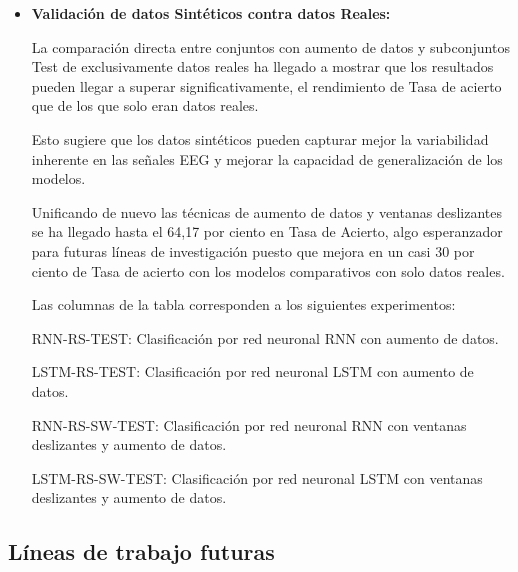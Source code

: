 \begin{itemize}
	
	\item
	\textbf{Validación de datos Sintéticos contra datos Reales:}


	La comparación directa entre conjuntos con aumento de datos y subconjuntos Test de exclusivamente datos reales ha llegado a mostrar que los resultados  pueden llegar a superar significativamente, el rendimiento de Tasa de acierto que de los que solo eran datos reales. 
	
	Esto sugiere que los datos sintéticos pueden capturar mejor la variabilidad inherente en las señales EEG y mejorar la capacidad de generalización de los modelos.
	
	Unificando de nuevo las técnicas de aumento de datos y ventanas deslizantes se ha llegado hasta el 64,17 por ciento en Tasa de Acierto, algo esperanzador para futuras líneas de investigación puesto que mejora en un casi 30 por ciento de Tasa de acierto con los modelos comparativos con solo datos reales.


	Las columnas de la tabla corresponden a los siguientes experimentos:

RNN-RS-TEST: Clasificación por red neuronal RNN con aumento de datos.

LSTM-RS-TEST: Clasificación por red neuronal LSTM con aumento de datos.

RNN-RS-SW-TEST: Clasificación por red neuronal RNN con ventanas deslizantes y aumento de datos.

LSTM-RS-SW-TEST: Clasificación por red neuronal LSTM con ventanas deslizantes y aumento de datos.


\end{itemize}

\subsection{Líneas de trabajo futuras}


